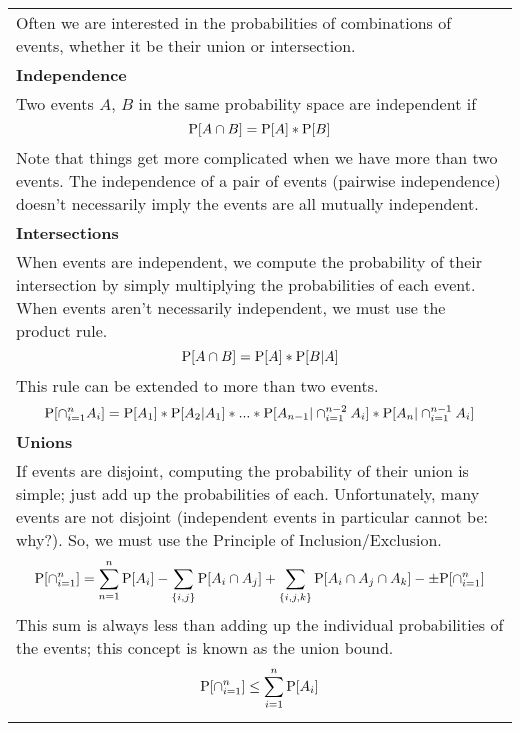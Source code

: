 {\tabulinesep=1mm
\begin{tabu}{|p{16cm} |}
\hline
Often we are interested in the probabilities of combinations of events, whether it be their union or intersection. \\ 
\vspace{2mm}
\textbf{Independence} \\
Two events $A$, $B$ in the same probability space are independent if 
\[\P[A \cap B] = \P[A] * \P[B] \]
Note that things get more complicated when we have more than two events. The independence of a pair of events (pairwise independence) doesn't necessarily imply the events are all mutually independent. \\
\vspace{2mm}
\textbf{Intersections} \\
When events are independent, we compute the probability of their intersection by simply multiplying the probabilities of each event. When events aren't necessarily independent, we must use the product rule. 
\[\P[A \cap B] = \P[A] * \P[B|A] \]
This rule can be extended to more than two events.
\[\P[\cap^{n}_{i=1}A_i] = \P[A_1] * \P[A_2|A_1] * ... * \P[A_{n-1}|\cap^{n-2}_{i=1}A_i] *  \P[A_{n}|\cap^{n-1}_{i=1}A_i]  \]
\vspace{2mm}
\textbf{Unions}\\
If events are disjoint, computing the probability of their union is simple; just add up the probabilities of each. Unfortunately, many events are not disjoint (independent events in particular cannot be: why?). So, we must use the Principle of Inclusion/Exclusion.
\[\P[\cap^{n}_{i=1}] = \sum_{n=1}^{n} \P[A_i] - \sum_{\{i, j\}} \P[A_i \cap A_j] + \sum_{\{i, j, k\}} \P[A_i \cap A_j \cap A_k] - \pm \P[\cap^{n}_{i=1}] \]
This sum is always less than adding up the individual probabilities of the events; this concept is known as the union bound. 
\[\P[\cap^{n}_{i=1}] \leq \sum^{n}_{i=1} \P[A_i] \]
\\
\hline
\end{tabu}
}